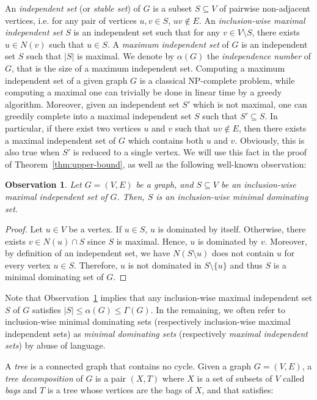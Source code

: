\documentclass[10pt]{article}
\newtheorem{observation}{Observation}
\begin{document}
An {\em independent set} (or {\em stable set}) of $G$ is a subset $S \subseteq V$ of pairwise non-adjacent vertices, i.e. for any pair of vertices $u,v \in S$, $uv \not\in E$. An {\em inclusion-wise maximal independent set} $S$ is an independent set such that for any $v \in V \setminus S$, there exists $u \in N(v)$ such that $u \in S$. A {\em maximum independent set} of $G$ is an independent set $S$ such that $|S|$ is maximal. We denote by $\alpha(G)$ the \emph{independence number} of $G$, that is the size of a maximum independent set. Computing a maximum independent set of a given graph $G$ is a classical NP-complete problem, while computing a maximal one can trivially be done in linear time by a greedy algorithm. Moreover, given an independent set $S'$ which is not maximal, one can greedily complete into a maximal independent set $S$ such that $S' \subseteq S$. In particular, if there exist two vertices $u$ and $v$ such that $uv \not\in E$, then there exists a maximal independent set of $G$ which contains both $u$ and $v$. Obviously, this is also true when $S'$ is reduced to a single vertex. We will use this fact in the proof of Theorem~\ref{thm:upper-bound}, as well as the following well-known observation:

\begin{observation} \label{obs:maxIS-minDS}
Let $G=(V,E)$ be a graph, and $S \subseteq V$ be an inclusion-wise maximal independent set of $G$. Then, $S$ is an inclusion-wise minimal dominating set.
\end{observation}

\begin{proof}
Let $u \in V$ be a vertex. If $u \in S$, $u$ is dominated by itself. Otherwise, there exists $v \in N(u) \cap S$ since $S$ is maximal. Hence, $u$ is dominated by $v$. Moreover, by definition of an independent set, we have $N(S\setminus u)$ does not contain $u$ for every vertex $u \in S$. Therefore, $u$ is not dominated in $S \setminus \{u\}$ and thus $S$ is a minimal dominating set of $G$. 
\end{proof}

Note that Observation~\ref{obs:maxIS-minDS} implies that any inclusion-wise maximal independent set $S$ of $G$ satisfies $|S| \le \alpha(G) \le \Gamma(G)$.   
In the remaining, we often refer to inclusion-wise minimal dominating sets (respectively inclusion-wise maximal independent sets) as \emph{minimal dominating sets} (respectively \emph{maximal independent sets}) by abuse of language.

A \emph{tree} is a connected graph that contains no cycle. Given a graph $G=(V,E)$, a \emph{tree decomposition} of $G$ is a pair $(X,T)$ where $X$ is a set of subsets of $V$ called \emph{bags} and $T$ is a tree whose vertices are the bags of $X$, and that satisfies:
\end{document}
